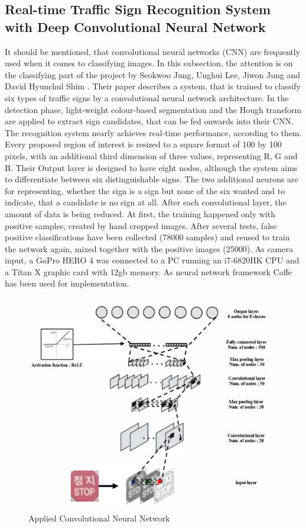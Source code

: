 \subsection{Real-time Traffic Sign Recognition System with Deep Convolutional Neural Network}\label{ssec:koreancnn}
It should be mentioned, that convolutional neural networks (CNN) are frequently used when it comes to classifying images.
In this subsection, the attention is on the classifying part of the project by Seokwoo Jung, Unghui Lee, Jiwon Jung and David Hyunchul Shim \cite{tsrcnn}. 
Their paper describes a system, that is trained to classify six types of traffic signs by a convolutional
neural network architecture. In the detection phase, light-weight colour-based segmentation and the Hough transform are applied to extract sign candidates, that can be fed onwards into their CNN. The recognition system nearly achieves real-time performance, according to them. \newline
Every proposed region of interest is resized to a square format of 100 by 100 pixels, with an additional third dimension of three values, representing R, G and B. Their Output layer is designed to have eight nodes, although the system aims to differentiate between six distinguishable signs. The two additional neurons are for representing, whether the sign is a sign but none of the six wanted and to indicate, that a candidate is no sign at all. After each convolutional layer, the amount of data is being reduced.  
At first, the
training happened only with positive samples, created by hand cropped images. After several tests, false positive classifications have been collected (78000 samples) and reused to train the network again, mixed together with the positive images (25000). As camera input, a GoPro HERO 4 was connected to a PC running an i7-6820HK CPU and a Titan X graphic card with 12gb memory. As neural network framework Caffe has been used for implementation.

\begin{figure}[H]
	\centering
	\includegraphics[width = 0.75\linewidth]{images/koreancnn.png}
	\caption{Applied Convolutional Neural Network \cite{tsrcnn}}
	\label{fig:koreanNN }
\end{figure}
